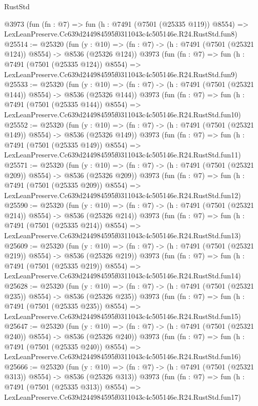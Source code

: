 \begin{lexlean}{RustStd}
\begin{coremodule}
    @3973
    (fun (fn : @7) =>
    fun (h : @7491 (@7501 (@25335 @119)) @8554) =>
    LexLeanPreserve.Cc639d244984595f0311043c4c505146e.R24.RustStd.fun8)
@25514 := @25320
    (fun (y : @10) => (fn : @7) -> (h : @7491 (@7501 (@25321 @124)) @8554) -> @8536 (@25326 @124))
    @3973
    (fun (fn : @7) =>
    fun (h : @7491 (@7501 (@25335 @124)) @8554) =>
    LexLeanPreserve.Cc639d244984595f0311043c4c505146e.R24.RustStd.fun9)
@25533 := @25320
    (fun (y : @10) => (fn : @7) -> (h : @7491 (@7501 (@25321 @144)) @8554) -> @8536 (@25326 @144))
    @3973
    (fun (fn : @7) =>
    fun (h : @7491 (@7501 (@25335 @144)) @8554) =>
    LexLeanPreserve.Cc639d244984595f0311043c4c505146e.R24.RustStd.fun10)
@25552 := @25320
    (fun (y : @10) => (fn : @7) -> (h : @7491 (@7501 (@25321 @149)) @8554) -> @8536 (@25326 @149))
    @3973
    (fun (fn : @7) =>
    fun (h : @7491 (@7501 (@25335 @149)) @8554) =>
    LexLeanPreserve.Cc639d244984595f0311043c4c505146e.R24.RustStd.fun11)
@25571 := @25320
    (fun (y : @10) => (fn : @7) -> (h : @7491 (@7501 (@25321 @209)) @8554) -> @8536 (@25326 @209))
    @3973
    (fun (fn : @7) =>
    fun (h : @7491 (@7501 (@25335 @209)) @8554) =>
    LexLeanPreserve.Cc639d244984595f0311043c4c505146e.R24.RustStd.fun12)
@25590 := @25320
    (fun (y : @10) => (fn : @7) -> (h : @7491 (@7501 (@25321 @214)) @8554) -> @8536 (@25326 @214))
    @3973
    (fun (fn : @7) =>
    fun (h : @7491 (@7501 (@25335 @214)) @8554) =>
    LexLeanPreserve.Cc639d244984595f0311043c4c505146e.R24.RustStd.fun13)
@25609 := @25320
    (fun (y : @10) => (fn : @7) -> (h : @7491 (@7501 (@25321 @219)) @8554) -> @8536 (@25326 @219))
    @3973
    (fun (fn : @7) =>
    fun (h : @7491 (@7501 (@25335 @219)) @8554) =>
    LexLeanPreserve.Cc639d244984595f0311043c4c505146e.R24.RustStd.fun14)
@25628 := @25320
    (fun (y : @10) => (fn : @7) -> (h : @7491 (@7501 (@25321 @235)) @8554) -> @8536 (@25326 @235))
    @3973
    (fun (fn : @7) =>
    fun (h : @7491 (@7501 (@25335 @235)) @8554) =>
    LexLeanPreserve.Cc639d244984595f0311043c4c505146e.R24.RustStd.fun15)
@25647 := @25320
    (fun (y : @10) => (fn : @7) -> (h : @7491 (@7501 (@25321 @240)) @8554) -> @8536 (@25326 @240))
    @3973
    (fun (fn : @7) =>
    fun (h : @7491 (@7501 (@25335 @240)) @8554) =>
    LexLeanPreserve.Cc639d244984595f0311043c4c505146e.R24.RustStd.fun16)
@25666 := @25320
    (fun (y : @10) => (fn : @7) -> (h : @7491 (@7501 (@25321 @313)) @8554) -> @8536 (@25326 @313))
    @3973
    (fun (fn : @7) =>
    fun (h : @7491 (@7501 (@25335 @313)) @8554) =>
    LexLeanPreserve.Cc639d244984595f0311043c4c505146e.R24.RustStd.fun17)

\end{coremodule}
\end{lexlean}
